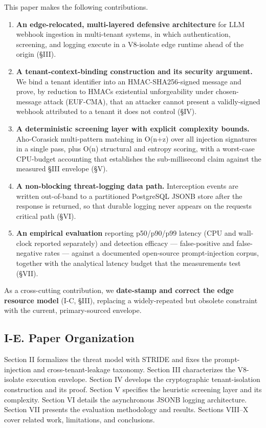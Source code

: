 This paper makes the following contributions.

\begin{enumerate}
\def\labelenumi{\arabic{enumi}.}
\tightlist
\item
  \textbf{An edge-relocated, multi-layered defensive architecture} for
  LLM webhook ingestion in multi-tenant systems, in which
  authentication, screening, and logging execute in a V8-isolate edge
  runtime ahead of the origin (§III).
\item
  \textbf{A tenant-context-binding construction and its security
  argument.} We bind a tenant identifier into an HMAC-SHA256-signed
  message and prove, by reduction to HMAC\textquotesingle s existential
  unforgeability under chosen-message attack (EUF-CMA), that an attacker
  cannot present a validly-signed webhook attributed to a tenant it does
  not control (§IV).
\item
  \textbf{A deterministic screening layer with explicit complexity
  bounds.} Aho-Corasick multi-pattern matching in O(n+z) over all
  injection signatures in a single pass, plus O(n) structural and
  entropy scoring, with a worst-case CPU-budget accounting that
  establishes the sub-millisecond claim against the measured §III
  envelope (§V).
\item
  \textbf{A non-blocking threat-logging data path.} Interception events
  are written out-of-band to a partitioned PostgreSQL JSONB store after
  the response is returned, so that durable logging never appears on the
  request\textquotesingle s critical path (§VI).
\item
  \textbf{An empirical evaluation} reporting p50/p90/p99 latency (CPU
  and wall-clock reported separately) and detection efficacy ---
  false-positive and false-negative rates --- against a documented
  open-source prompt-injection corpus, together with the analytical
  latency budget that the measurements test (§VII).
\end{enumerate}

As a cross-cutting contribution, we \textbf{date-stamp and correct the
edge resource model} (I-C, §III), replacing a widely-repeated but
obsolete constraint with the current, primary-sourced envelope.

\subsection{I-E. Paper Organization}\label{i-e-paper-organization}

Section II formalizes the threat model with STRIDE and fixes the
prompt-injection and cross-tenant-leakage taxonomy. Section III
characterizes the V8-isolate execution envelope. Section IV develops the
cryptographic tenant-isolation construction and its proof. Section V
specifies the heuristic screening layer and its complexity. Section VI
details the asynchronous JSONB logging architecture. Section VII
presents the evaluation methodology and results. Sections VIII--X cover
related work, limitations, and conclusions.

